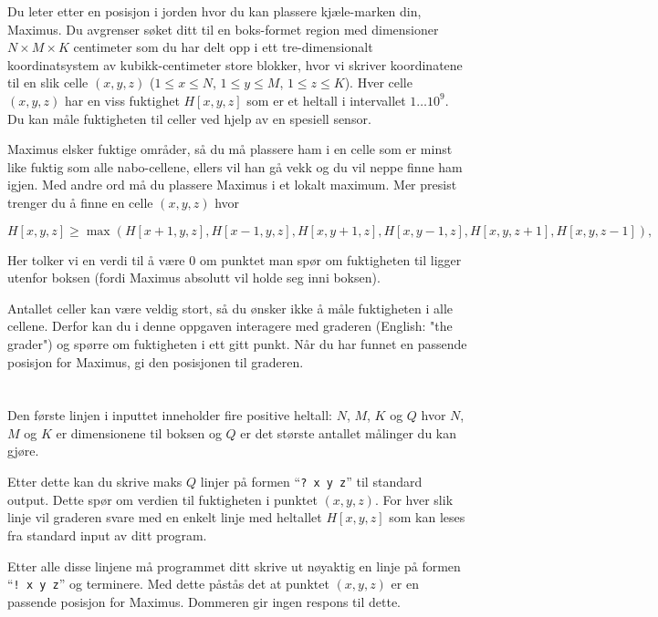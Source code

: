\ifx\boi\undefined\fi
\def\version{jury-1}
Du leter etter en posisjon i jorden hvor du kan plassere kjæle-marken din, Maximus. Du avgrenser søket ditt til en boks-formet region med dimensioner $N \times M \times K$ centimeter som du har delt opp i ett tre-dimensionalt koordinatsystem av kubikk-centimeter store blokker, hvor vi skriver koordinatene til en slik celle $(x,y,z)$ ($1 \le x \le N$, $1 \le y \le M$, $1 \le z \le K$). Hver celle $(x,y,z)$ har en viss fuktighet $H[x,y,z]$ som er et heltall i intervallet $1 \dots 10^9$. Du kan måle fuktigheten til celler ved hjelp av en spesiell sensor.

Maximus elsker fuktige områder, så du må plassere ham i en celle som er minst like fuktig som alle nabo-cellene, ellers vil han gå vekk og du vil neppe finne ham igjen. Med andre ord må du plassere Maximus i et lokalt maximum. Mer presist trenger du å finne en celle $(x,y,z)$ hvor

$$
H[x,y,z] \ge \max(H[x+1,y,z], H[x-1,y,z], H[x,y+1,z], H[x,y-1,z], H[x,y,z+1], H[x,y,z-1]),
$$

Her tolker vi en verdi til å være 0 om punktet man spør om fuktigheten til ligger utenfor boksen (fordi Maximus absolutt vil holde seg inni boksen).

Antallet celler kan være veldig stort, så du ønsker ikke å måle fuktigheten i alle cellene. Derfor kan du i denne oppgaven interagere med graderen (English: "the grader") og spørre om fuktigheten i ett gitt punkt.
Når du har funnet en passende posisjon for Maximus, gi den posisjonen til graderen.

\section*{\interactivity}
Den første linjen i inputtet inneholder fire positive heltall: $N$, $M$, $K$ og $Q$ hvor $N$, $M$ og $K$ er dimensionene til boksen og $Q$ er det største antallet målinger du kan gjøre.

Etter dette kan du skrive maks $Q$ linjer på formen ``\texttt{?\ x y z}'' til standard output. Dette spør om verdien til fuktigheten i punktet $(x,y,z)$. For hver slik linje vil graderen svare med en enkelt linje med heltallet $H[x,y,z]$ som kan leses fra standard input av ditt program.

Etter alle disse linjene må programmet ditt skrive ut nøyaktig en linje på formen ``\texttt{!\ x y z}'' og terminere. Med dette påstås det at punktet $(x,y,z)$ er en passende posisjon for Maximus. Dommeren gir ingen respons til dette.

